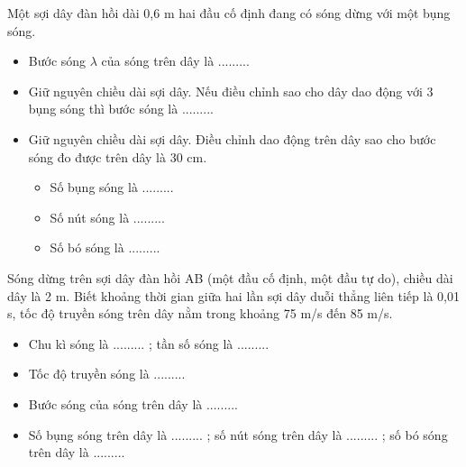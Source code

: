 \begin{vidu}%
Một sợi dây đàn hồi dài 0,6 m hai đầu cố định đang có sóng dừng với một bụng sóng.
\begin{itemize}
\item[1.] Bước sóng $\lambda$ của sóng trên dây là .........
\item[2.] Giữ nguyên chiều dài sợi dây. Nếu điều chỉnh sao cho dây dao động với 3 bụng sóng thì bước sóng là .........
\item[3.] Giữ nguyên chiều dài sợi dây. Điều chỉnh dao động trên dây sao cho bước sóng đo được trên dây là 30 cm. 
\begin{itemize}
\item Số bụng sóng là ......... 
\item Số nút sóng là ......... 
\item Số bó sóng  là ......... 
\end{itemize}
\end{itemize}
\end{vidu}
\begin{vidu}%
Sóng dừng trên sợi dây đàn hồi AB (một đầu cố định, một đầu tự do), chiều dài dây là 2 m. Biết khoảng thời gian giữa hai lần sợi dây duỗi thẳng liên tiếp là 0,01 s, tốc độ truyền sóng trên dây nằm trong khoảng 75 m/s đến 85 m/s. 
\begin{itemize}
\item[1.] Chu kì sóng  là ......... ; tần số sóng là ......... 
\item[2.] Tốc độ truyền sóng là ......... 
\item[3.] Bước sóng của sóng trên dây là ......... 
\item[4.] Số bụng sóng  trên dây  là ......... ; số nút sóng trên dây  là ......... ; số bó sóng trên dây là ......... 
\end{itemize}
\end{vidu} 
